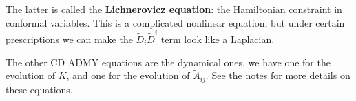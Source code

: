 \documentclass[main.tex]{subfiles}
\begin{document}
The latter is called the \textbf{Lichnerovicz equation}: the Hamiltonian constraint in conformal variables. 
This is a complicated nonlinear equation, but under certain prescriptions we can make the \(\widetilde{D}_{i} \widetilde{D}^{i}\) term look like a Laplacian. 

The other CD ADMY equations are the dynamical ones, we have one for the evolution of \(K\), and one for the evolution of \(\widetilde{A}_{ij}\). 
See the notes for more details on these equations. 
\end{document}
